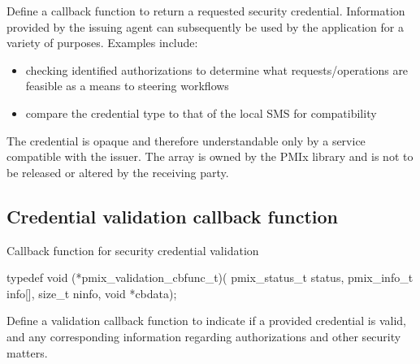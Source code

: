 \descr

Define a callback function to return a requested security credential. Information provided by the issuing agent can subsequently be used
by the application for a variety of purposes. Examples include:

\begin{itemize}
    \item checking identified authorizations to determine what requests/operations are feasible as a means to steering workflows
    \item compare the credential type to that of the local SMS for compatibility
\end{itemize}

\adviceuserstart
The credential is opaque and therefore understandable only by a service compatible with the issuer. The  array is owned by the \ac{PMIx} library and is not to be released or altered by the receiving party.
\adviceuserend

\subsection{Credential validation callback function}

\summary

Callback function for security credential validation

\format

\cspecificstart
\begin{codepar}
typedef void (*pmix_validation_cbfunc_t)(
                             pmix_status_t status,
                             pmix_info_t info[], size_t ninfo,
                             void *cbdata);
\end{codepar}
\cspecificend

\begin{arglist}
\end{arglist}

\descr

Define a validation callback function to indicate if a provided credential is valid, and any corresponding information regarding authorizations and other security matters.


